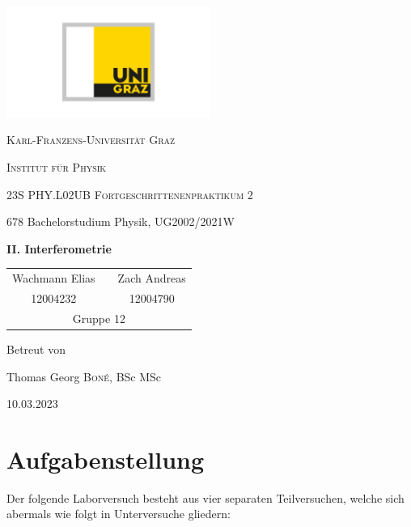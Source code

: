\documentclass[ngerman]{scrartcl}
\begin{document}
\begin{titlepage}
    \centering
    \includegraphics[width=0.5\textwidth]{../../99_Misc/Logo_KF.pdf}\par\vspace{0.8cm}
    {\scshape\LARGE{Karl-Franzens-Universität Graz}\par}
    {\scshape\LARGE{Institut für Physik}\par}
    \vspace{1cm}
    {\scshape\Large{23S PHY.L02UB Fortgeschrittenenpraktikum 2}\par}
    678 Bachelorstudium Physik, UG2002/2021W\par
    \vspace{1.5cm}
    {\huge\bfseries II. Interferometrie\par}
    \vspace{2cm}
    \begin{table}[H]
        \centering
        \begin{tabular}{c c c}
            \Large Wachmann Elias &  & \Large Zach Andreas \\
            \Large 12004232       &  & \Large 12004790     \\
            \multicolumn{3}{c}{Gruppe 12}
        \end{tabular}
    \end{table}
    \vfill
    \Large Betreut von\par
    Thomas Georg \textsc{Boné}, BSc MSc

    \vfill

    {\large 10.03.2023\par}
\end{titlepage}

\clearpage
\tableofcontents
\newpage

\section[Aufgabenstellung]{Aufgabenstellung \cite{ref:angabe}}
\label{sec:aufgabenstellung}

Der folgende Laborversuch besteht aus vier separaten Teilversuchen, welche sich abermals wie folgt in Unterversuche gliedern:
\end{document}
